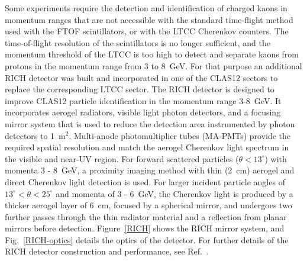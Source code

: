 \documentclass[final,3p,twocolumn]{elsarticle}
\begin{document}
Some experiments require the detection and identification of charged kaons in momentum ranges that are not 
accessible with the standard time-flight method used with the FTOF scintillators, or with the LTCC Cherenkov
counters. The time-of-flight resolution of the scintillators is no longer sufficient, and the momentum threshold of the LTCC
is too high to detect and separate kaons from protons in the momentum range from 3 to 8~GeV. For that purpose
an additional RICH detector was built and incorporated in one of the CLAS12 sectors to replace the corresponding
LTCC sector. The RICH detector is designed to improve CLAS12 particle identification in the momentum range
3-8~GeV. It incorporates aerogel radiators, visible light photon detectors, and a focusing mirror system that is
used to reduce the detection area instrumented by photon detectors to 1~m$^2$.  Multi-anode photomultiplier
tubes (MA-PMTs) provide the required spatial resolution and match the aerogel Cherenkov light spectrum in the
visible and near-UV region. For forward scattered particles ($\theta < 13^\circ$) with momenta 3 - 8~GeV, a
proximity imaging method with thin (2~cm) aerogel and direct Cherenkov light detection is used. For larger incident
particle angles of $13^\circ < \theta < 25^\circ$ and momenta of 3 - 6~GeV, the Cherenkov light is produced by a
thicker aerogel layer of 6~cm, focused by a spherical mirror, and undergoes two further passes through the
thin radiator material and a reflection from planar mirrors before detection. Figure~\ref{RICH} shows the RICH mirror
system, and Fig.~\ref{RICH-optics} details the optics of the detector. For further details of the RICH detector 
construction and performance, see Ref.~\cite{RICH}.
\end{document}
